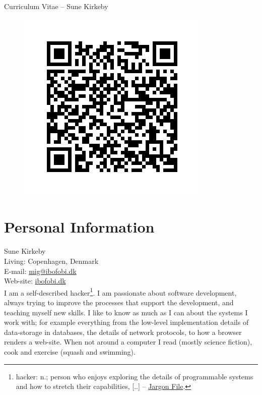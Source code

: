 \documentclass[margin,line,a4paper]{resume}
\begin{document}
{\sc \Large Curriculum Vitae -- Sune Kirkeby}
\begin{resume}

\begin{figure}
\vspace{-1.3cm}
\begin{center}
\includegraphics[scale=0.2,bb=0 0 350 350]{qr.png}
\end{center}
\vspace{-1cm}
\end{figure}

\section{\mysidestyle Personal Information}\vspace{1mm}
Sune Kirkeby \\
Living: Copenhagen, Denmark \\
E-mail: \href{mailto:mig@ibofobi.dk}{mig@ibofobi.dk} \\
Web-site: \href{https://ibofobi.dk/}{ibofobi.dk}\\

I am a self-described hacker\footnote{hacker: n.;  person who enjoys exploring
the details of programmable systems and how to stretch their capabilities,
[..] -- \href{http://www.catb.org/jargon/html/H/hacker.html}{Jargon File}.}.
I am passionate about software development, always trying to improve the
processes that support the development, and teaching myself new skills. I like
to know as much as I can about the systems I work with; for example everything
from the low-level implementation details of data-storage in databases, the
details of network protocols, to how a browser renders a web-site.
When not around a computer I read (mostly science fiction), cook and exercise
(squash and swimming).


\end{resume}
\end{document}
